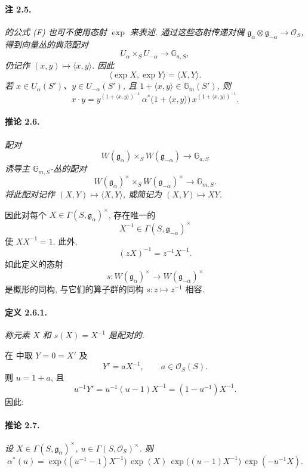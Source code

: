 \paragraph{\textbf{注 2.5.}}
\emph{ 的公式 \textup{(F)} 也可不使用态射 \(\exp\) 来表述. 通过这些态射传递对偶 \(\mathfrak g_\alpha\otimes\mathfrak g_{-\alpha}\to\mathscr O_S\), 得到向量丛的典范配对}
\[
  U_\alpha\times_S U_{-\alpha}\longrightarrow\mathbb G_{a,S},
\]
\emph{仍记作 \((x,y)\mapsto\langle x,y\rangle\). 因此}
\[
  \langle\exp X,\exp Y\rangle=\langle X,Y\rangle.
\]
\emph{若 \(x\in U_\alpha(S')\)、\(y\in U_{-\alpha}(S')\), 且 \(1+\langle x,y\rangle\in\mathbb G_m(S')\), 则}
\[
  x\cdot y
   =y^{(1+\langle x,y\rangle)^{-1}}\,
      \alpha^\ast\bigl(1+\langle x,y\rangle\bigr)\,
      x^{(1+\langle x,y\rangle)^{-1}}.
\]

\paragraph{\textbf{推论 2.6.}}
\emph{配对}
\[
  W(\mathfrak g_\alpha)\times_S W(\mathfrak g_{-\alpha})
    \longrightarrow\mathbb G_{a,S}
\]
\emph{诱导主 \(\mathbb G_{m,S}\)-丛的配对}
\[
  W(\mathfrak g_\alpha)^\times
    \times_S W(\mathfrak g_{-\alpha})^\times
      \longrightarrow\mathbb G_{m,S}.
\]
\emph{将此配对记作 \((X,Y)\mapsto\langle X,Y\rangle\), 或简记为 \((X,Y)\mapsto XY\).}

因此对每个 \(X\in\Gamma(S,\mathfrak g_\alpha)^\times\), 存在唯一的
\[
  X^{-1}\in\Gamma(S,\mathfrak g_{-\alpha})^\times
\]
使 \(XX^{-1}=1\). 此外,
\[
  (zX)^{-1}=z^{-1}X^{-1}.
\]
如此定义的态射
\[
  s\colon W(\mathfrak g_\alpha)^\times
    \longrightarrow W(\mathfrak g_{-\alpha})^\times
\]
是概形的同构, 与它们的算子群的同构 \(s\colon z\mapsto z^{-1}\) 相容.

\paragraph{\textbf{定义 2.6.1.}}
\emph{称元素 \(X\) 和 \(s(X)=X^{-1}\) 是配对的.}

在 中取 \(Y=0=X'\) 及
\[
  Y'=aX^{-1},\qquad a\in\mathscr O_S(S).
\]
则 \(u=1+a\), 且
\[
  u^{-1}Y'
   =u^{-1}(u-1)X^{-1}
   =(1-u^{-1})X^{-1}.
\]
因此:

\paragraph{\textbf{推论 2.7.}}
\emph{设 \(X\in\Gamma(S,\mathfrak g_\alpha)^\times\), \(u\in\Gamma(S,\mathscr O_S)^\times\). 则}
\[
  \alpha^\ast(u)
   =\exp\bigl((u^{-1}-1)X^{-1}\bigr)\,
      \exp(X)\,
      \exp\bigl((u-1)X^{-1}\bigr)\,
      \exp(-u^{-1}X).
\]

